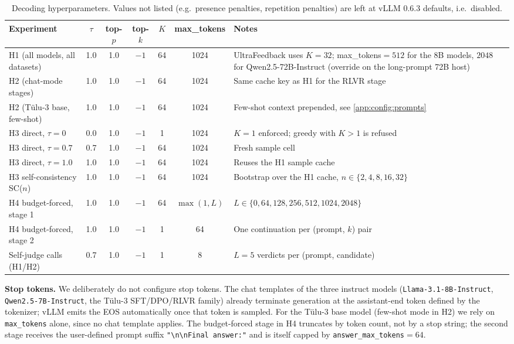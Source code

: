\begin{table}[t]
\centering
\small
\setlength{\tabcolsep}{4pt}
\caption{Decoding hyperparameters. Values not listed (e.g.\ presence
penalties, repetition penalties) are left at vLLM 0.6.3 defaults, i.e.\
disabled.}
\label{tab:decoding}
\begin{tabular}{lccccc p{6.6cm}}
\toprule
Experiment & $\tau$ & top-$p$ & top-$k$ & $K$ & max\_tokens & Notes \\
\midrule
H1 (all models, all datasets) & 1.0 & 1.0 & $-1$ & 64 & 1024 & UltraFeedback uses $K=32$; max\_tokens${}=512$ for the 8B models, $2048$ for Qwen2.5-72B-Instruct (override on the long-prompt 72B host) \\
H2 (chat-mode stages)         & 1.0 & 1.0 & $-1$ & 64 & 1024 & Same cache key as H1 for the RLVR stage \\
H2 (Tülu-3 base, few-shot)    & 1.0 & 1.0 & $-1$ & 64 & 1024 & Few-shot context prepended, see \cref{app:config:prompts} \\
H3 direct, $\tau{=}0$         & 0.0 & 1.0 & $-1$ & 1  & 1024 & $K{=}1$ enforced; greedy with $K{>}1$ is refused \\
H3 direct, $\tau{=}0.7$       & 0.7 & 1.0 & $-1$ & 64 & 1024 & Fresh sample cell \\
H3 direct, $\tau{=}1.0$       & 1.0 & 1.0 & $-1$ & 64 & 1024 & Reuses the H1 sample cache \\
H3 self-consistency SC($n$)   & 1.0 & 1.0 & $-1$ & 64 & 1024 & Bootstrap over the H1 cache, $n\in\{2,4,8,16,32\}$ \\
H4 budget-forced, stage 1     & 1.0 & 1.0 & $-1$ & 64 & $\max(1,L)$ & $L\in\{0,64,128,256,512,1024,2048\}$ \\
H4 budget-forced, stage 2     & 1.0 & 1.0 & $-1$ & 1  & 64 & One continuation per (prompt, $k$) pair \\
Self-judge calls (H1/H2)      & 0.7 & 1.0 & $-1$ & 1  & 8  & $L=5$ verdicts per (prompt, candidate) \\
\bottomrule
\end{tabular}
\end{table}

\textbf{Stop tokens.}
We deliberately do not configure stop tokens. The chat templates of the
three instruct models (\texttt{Llama-3.1-8B-Instruct},
\texttt{Qwen2.5-7B-Instruct}, the Tülu-3 SFT/DPO/RLVR family) already
terminate generation at the assistant-end token defined by the
tokenizer; vLLM emits the EOS automatically once that token is sampled.
For the Tülu-3 base model (few-shot mode in H2) we rely on
\texttt{max\_tokens} alone, since no chat template applies. The
budget-forced stage in H4 truncates by token count, not by a stop
string; the second stage receives the user-defined prompt suffix
\texttt{"\textbackslash n\textbackslash nFinal answer:"} and is itself
capped by \texttt{answer\_max\_tokens}${}=64$.

